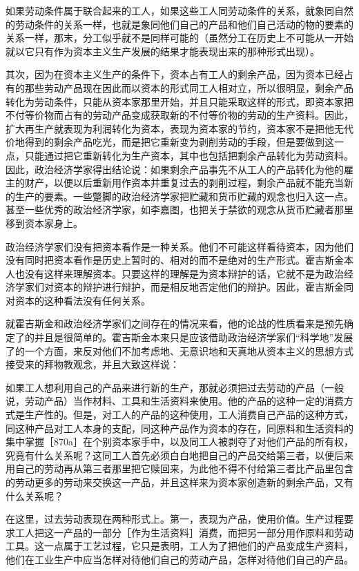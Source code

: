 如果劳动条件属于联合起来的工人，如果这些工人同劳动条件的关系，就象同自然的劳动条件的关系一样，也就是象同他们自己的产品和他们自己活动的物的要素的关系一样，那末，分工似乎就不是同样可能的（虽然分工在历史上不可能从一开始就以它只有作为资本主义生产发展的结果才能表现出来的那种形式出现）。

其次，因为在资本主义生产的条件下，资本占有工人的剩余产品，因为资本已经占有的那些劳动产品现在因此而以资本的形式同工人相对立，所以很明显，剩余产品转化为劳动条件，只能从资本家那里开始，并且只能采取这样的形式，即资本家把不付等价物而占有的劳动产品变成获取新的不付等价物的劳动的生产资料。因此，扩大再生产就表现为利润转化为资本，表现为资本家的节约，资本家不是把他无代价地得到的剩余产品吃光，而是把它重新变为剥削劳动的手段，但是要做到这一点，只能通过把它重新转化为生产资本，其中也包括把剩余产品转化为劳动资料。因此，政治经济学家得出结论说：如果剩余产品事先不从工人的产品转化为他的雇主的财产，以便以后重新用作资本并重复过去的剥削过程，剩余产品就不能充当新的生产的要素。一些蹩脚的政治经济学家把贮藏和货币贮藏的观念也归入这一点。甚至一些优秀的政治经济学家，如李嘉图，也把关于禁欲的观念从货币贮藏者那里移到资本家身上。

政治经济学家们没有把资本看作是一种关系。他们不可能这样看待资本，因为他们没有同时把资本看作是历史上暂时的、相对的而不是绝对的生产形式。霍吉斯金本人也没有这样来理解资本。只要这样的理解是为资本辩护的话，它就不是为政治经济学家们对资本的辩护进行辩护，而是相反地否定他们的辩护。因此，霍吉斯金同对资本的这种看法没有任何关系。

就霍吉斯金和政治经济学家们之间存在的情况来看，他的论战的性质看来是预先确定了的并且是很简单的。霍吉斯金本来只是应该借助政治经济学家们“科学地”发展了的一个方面，来反对他们不加考虑地、无意识地和天真地从资本主义的思想方式接受来的拜物教观念，并且大致这样说：

如果工人想利用自己的产品来进行新的生产，那就必须把过去劳动的产品（一般说，劳动产品）当作材料、工具和生活资料来使用。他的产品的这种一定的消费方式是生产性的。但是，对工人的产品的这种使用，工人消费自己产品的这种方式，同这种产品对工人本身的支配，同这种产品作为资本的存在，同原料和生活资料的集中掌握［870a］在个别资本家手中，以及同工人被剥夺了对他们产品的所有权，究竟有什么关系呢？这同工人首先必须白白地把自己的产品交给第三者，以便后来用自己的劳动再从第三者那里把它赎回来，为此他不得不付给第三者比产品里包含的劳动更多的劳动来交换这一产品，并且这样来为资本家创造新的剩余产品，又有什么关系呢？

在这里，过去劳动表现在两种形式上。第一，表现为产品，使用价值。生产过程要求工人把这一产品的一部分［作为生活资料］消费，而把另一部分用作原料和劳动工具。这一点属于工艺过程，它只是表明，工人为了把他们的产品变成生产资料，他们在工业生产中应当怎样对待他们自己的劳动产品，怎样对待他们自己的产品。


